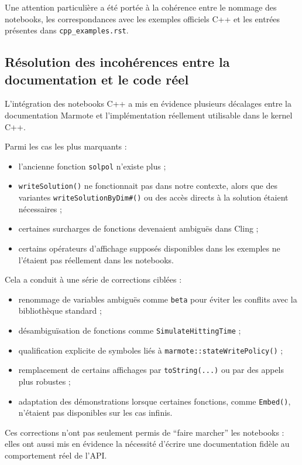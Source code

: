 \documentclass[a4paper,12pt,twoside]{article}
\begin{document}
Une attention particulière a été portée à la cohérence entre le nommage des notebooks, les correspondances avec les exemples officiels C++ et les entrées présentes dans \texttt{cpp\_examples.rst}.

\subsection{Résolution des incohérences entre la documentation et le code réel}

L'intégration des notebooks C++ a mis en évidence plusieurs décalages entre la documentation Marmote et l'implémentation réellement utilisable dans le kernel C++.

Parmi les cas les plus marquants :
\begin{itemize}
    \item l'ancienne fonction \texttt{solpol} n'existe plus ;
    \item \texttt{writeSolution()} ne fonctionnait pas dans notre contexte, alors que des variantes \texttt{writeSolutionByDim\#()} ou des accès directs à la solution étaient nécessaires ;
    \item certaines surcharges de fonctions devenaient ambiguës dans Cling ;
    \item certains opérateurs d'affichage supposés disponibles dans les exemples ne l'étaient pas réellement dans les notebooks.
\end{itemize}

Cela a conduit à une série de corrections ciblées :
\begin{itemize}
    \item renommage de variables ambiguës comme \texttt{beta} pour éviter les conflits avec la bibliothèque standard ;
    \item désambiguïsation de fonctions comme \texttt{SimulateHittingTime} ;
    \item qualification explicite de symboles liés à \texttt{marmote::stateWritePolicy()} ;
    \item remplacement de certains affichages par \texttt{toString(...)} ou par des appels plus robustes ;
    \item adaptation des démonstrations lorsque certaines fonctions, comme \texttt{Embed()}, n'étaient pas disponibles sur les cas infinis.
\end{itemize}

Ces corrections n'ont pas seulement permis de ``faire marcher'' les notebooks : elles ont aussi mis en évidence la nécessité d'écrire une documentation fidèle au comportement réel de l'API.
\end{document}
